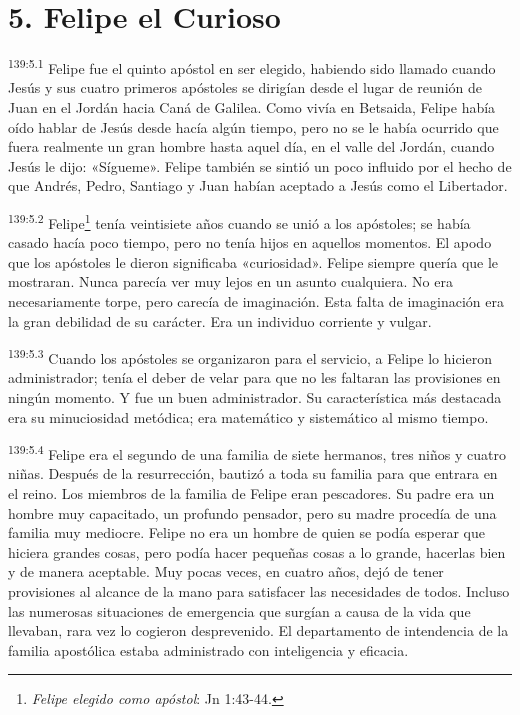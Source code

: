 \section*{5. Felipe el Curioso}
\par
\textsuperscript{139:5.1} Felipe fue el quinto apóstol en ser elegido, habiendo sido llamado cuando Jesús y sus cuatro primeros apóstoles se dirigían desde el lugar de reunión de Juan en el Jordán hacia Caná de Galilea. Como vivía en Betsaida, Felipe había oído hablar de Jesús desde hacía algún tiempo, pero no se le había ocurrido que fuera realmente un gran hombre hasta aquel día, en el valle del Jordán, cuando Jesús le dijo: «Sígueme». Felipe también se sintió un poco influido por el hecho de que Andrés, Pedro, Santiago y Juan habían aceptado a Jesús como el Libertador.

\par
\textsuperscript{139:5.2} Felipe\footnote{\textit{Felipe elegido como apóstol}: Jn 1:43-44.} tenía veintisiete años cuando se unió a los apóstoles; se había casado hacía poco tiempo, pero no tenía hijos en aquellos momentos. El apodo que los apóstoles le dieron significaba «curiosidad». Felipe siempre quería que le mostraran. Nunca parecía ver muy lejos en un asunto cualquiera. No era necesariamente torpe, pero carecía de imaginación. Esta falta de imaginación era la gran debilidad de su carácter. Era un individuo corriente y vulgar.

\par
\textsuperscript{139:5.3} Cuando los apóstoles se organizaron para el servicio, a Felipe lo hicieron administrador; tenía el deber de velar para que no les faltaran las provisiones en ningún momento. Y fue un buen administrador. Su característica más destacada era su minuciosidad metódica; era matemático y sistemático al mismo tiempo.

\par
\textsuperscript{139:5.4} Felipe era el segundo de una familia de siete hermanos, tres niños y cuatro niñas. Después de la resurrección, bautizó a toda su familia para que entrara en el reino. Los miembros de la familia de Felipe eran pescadores. Su padre era un hombre muy capacitado, un profundo pensador, pero su madre procedía de una familia muy mediocre. Felipe no era un hombre de quien se podía esperar que hiciera grandes cosas, pero podía hacer pequeñas cosas a lo grande, hacerlas bien y de manera aceptable. Muy pocas veces, en cuatro años, dejó de tener provisiones al alcance de la mano para satisfacer las necesidades de todos. Incluso las numerosas situaciones de emergencia que surgían a causa de la vida que llevaban, rara vez lo cogieron desprevenido. El departamento de intendencia de la familia apostólica estaba administrado con inteligencia y eficacia.

